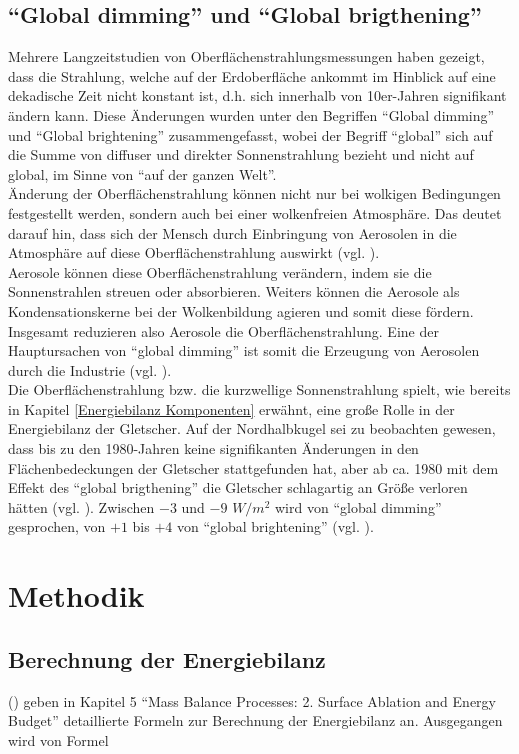 \documentclass[12pt,a4paper]{article}
\begin{document}
\subsection{``Global dimming'' und ``Global brigthening''}
Mehrere Langzeitstudien von Oberflächenstrahlungsmessungen haben gezeigt, dass die Strahlung, welche auf der Erdoberfläche ankommt im Hinblick auf eine dekadische Zeit nicht konstant ist, d.h. sich innerhalb von 10er-Jahren signifikant ändern kann. Diese Änderungen wurden unter den Begriffen ``Global dimming'' und ``Global brightening'' zusammengefasst, wobei der Begriff ``global'' sich auf die Summe von diffuser und direkter Sonnenstrahlung bezieht und nicht auf global, im Sinne von ``auf der ganzen Welt''.\\
Änderung der Oberflächenstrahlung können nicht nur bei wolkigen Bedingungen festgestellt werden, sondern auch bei einer wolkenfreien Atmosphäre. Das deutet darauf hin, dass sich der Mensch durch Einbringung von Aerosolen in die Atmosphäre auf diese Oberflächenstrahlung auswirkt (vgl. \cite[1]{GlobalDimming}).\\
Aerosole können diese Oberflächenstrahlung verändern, indem sie die Sonnenstrahlen streuen oder absorbieren. Weiters können die Aerosole als Kondensationskerne bei der Wolkenbildung agieren und somit diese fördern. Insgesamt reduzieren also Aerosole die Oberflächenstrahlung. Eine der Hauptursachen von ``global dimming'' ist somit die Erzeugung von Aerosolen durch die Industrie (vgl. \cite[14]{GlobalDimming}).\\ 
Die Oberflächenstrahlung bzw. die kurzwellige Sonnenstrahlung spielt, wie bereits in Kapitel \ref{Energiebilanz Komponenten} erwähnt, eine große Rolle in der Energiebilanz der Gletscher. Auf der Nordhalbkugel sei zu beobachten gewesen, dass bis zu den 1980-Jahren keine signifikanten Änderungen in den Flächenbedeckungen der Gletscher stattgefunden hat, aber ab ca. 1980 mit dem Effekt des ``global brigthening'' die Gletscher schlagartig an Größe verloren hätten (vgl. \cite[24]{GlobalDimming}). Zwischen $-3$ und $-9$ $W/m^2$ wird von ``global dimming'' gesprochen, von $+1$ bis $+4$ von ``global brightening'' (vgl. \cite[28]{EnlighteningGlobalDimming}).


\pagebreak
\section{Methodik}
\subsection{Berechnung der Energiebilanz}
\citeauthor{ThePhysicsOfGlaciers} (\citeyear{ThePhysicsOfGlaciers}) geben in Kapitel 5 ``Mass Balance Processes: 2. Surface Ablation and Energy Budget'' detaillierte Formeln zur Berechnung der Energiebilanz an. Ausgegangen wird von Formel 
\end{document}
